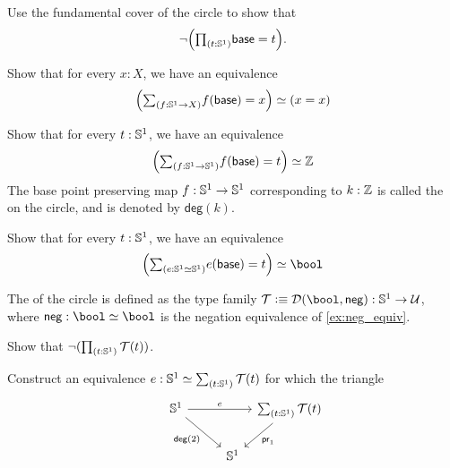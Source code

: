 \begin{exercises}
\item \label{ex:degk}Use the fundamental cover of the circle to show that
\begin{equation*}
\neg\Big(\prd{t:\sphere{1}}\base=t\Big).
\end{equation*}
\item \label{ex:circle_degk}
\begin{subexenum}
\item Show that for every $x:X$, we have an equivalence
\begin{equation*}
\eqv{\Big(\sm{f:\sphere{1}\to X}f(\base)= x \Big)}{(x=x)}
\end{equation*}
\item Show that for every $t:\mathbb{S}^{1}$, we have an equivalence
\begin{equation*}
\eqv{\Big(\sm{f:\sphere{1}\to \sphere{1}}f(\base)= t \Big)}{\Z}
\end{equation*}
The base point preserving map $f:\mathbb{S}^{1}\to\mathbb{S}^{1}$ corresponding to $k:\mathbb{Z}$ is called the  on the circle, and is denoted by $\mathsf{deg}(k)$.
\item Show that for every $t:\mathbb{S}^{1}$, we have an equivalence
\begin{equation*}
\eqv{\Big(\sm{e:\eqv{\sphere{1}}{\sphere{1}}}e(\base)= t \Big)}{\bool}
\end{equation*}
\end{subexenum}
\item \label{ex:circle_double_cover} The  of the circle is defined as the type family $\mathcal{T}\defeq\mathcal{D}(\bool,\mathsf{neg}):\sphere{1}\to\UU$, where $\mathsf{neg}:\eqv{\bool}{\bool}$ is the negation equivalence of \autoref{ex:neg_equiv}.
\begin{subexenum}
\item Show that $\neg(\prd{t:\sphere{1}}\mathcal{T}(t))$.
\item Construct an equivalence $e:\eqv{\sphere{1}}{\sm{t:\sphere{1}}\mathcal{T}(t)}$ for which the triangle
\begin{equation*}
\begin{tikzcd}[column sep=tiny]
\sphere{1} \arrow[rr,"e"] \arrow[dr,swap,"\mathsf{deg}(2)"] & & \sm{t:\sphere{1}}\mathcal{T}(t) \arrow[dl,"\proj 1"] \\
\phantom{\sm{t:\sphere{1}}\mathcal{T}(t)} & \sphere{1}
\end{tikzcd}
\end{equation*}

\end{subexenum}
\end{exercises}
